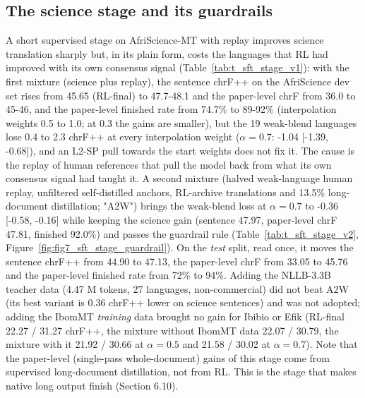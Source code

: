 \subsection{The science stage and its guardrails}\label{the-science-stage-and-its-guardrails}

A short supervised stage on AfriScience-MT with replay improves science translation sharply but, in its plain form, costs the languages that RL had improved with its own consensus signal (Table~\ref{tab:t_sft_stage_v1}): with the first mixture (science plus replay), the sentence chrF++ on the AfriScience dev set rises from 45.65 (RL-final) to 47.7-48.1 and the paper-level chrF from 36.0 to 45-46, and the paper-level finished rate from 74.7\% to 89-92\% (interpolation weights 0.5 to 1.0; at 0.3 the gains are smaller), but the 19 weak-blend languages lose 0.4 to 2.3 chrF++ at every interpolation weight (\(\alpha=0.7\): -1.04 {[}-1.39, -0.68{]}), and an L2-SP pull towards the start weights does not fix it. The cause is the replay of human references that pull the model back from what its own consensus signal had taught it. A second mixture (halved weak-language human replay, unfiltered self-distilled anchors, RL-archive translations and 13.5\% long-document distillation; "A2W") brings the weak-blend loss at \(\alpha=0.7\) to -0.36 {[}-0.58, -0.16{]} while keeping the science gain (sentence 47.97, paper-level chrF 47.81, finished 92.0\%) and passes the guardrail rule (Table~\ref{tab:t_sft_stage_v2}, Figure~\ref{fig:fig7_sft_stage_guardrail}). On the \emph{test} split, read once, it moves the sentence chrF++ from 44.90 to 47.13, the paper-level chrF from 33.05 to 45.76 and the paper-level finished rate from 72\% to 94\%. Adding the NLLB-3.3B teacher data (4.47 M tokens, 27 languages, non-commercial) did not beat A2W (its best variant is 0.36 chrF++ lower on science sentences) and was not adopted; adding the IbomMT \emph{training} data brought no gain for Ibibio or Efik (RL-final 22.27 / 31.27 chrF++, the mixture without IbomMT data 22.07 / 30.79, the mixture with it 21.92 / 30.66 at \(\alpha=0.5\) and 21.58 / 30.02 at \(\alpha=0.7\)). Note that the paper-level (single-pass whole-document) gains of this stage come from supervised long-document distillation, not from RL. This is the stage that makes native long output finish (Section 6.10).

